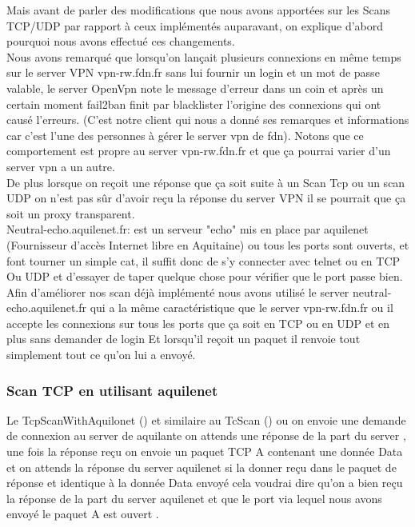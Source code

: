 \documentclass[12pt,a4paper]{article}
\begin{document}
Mais avant de parler des modifications que nous avons apportées sur les Scans TCP/UDP par rapport à ceux implémentés auparavant, on explique d’abord pourquoi nous avons effectué ces changements.\\

Nous avons remarqué que lorsqu’on lançait plusieurs connexions en même temps sur le server VPN vpn-rw.fdn.fr sans lui fournir un login et un mot de passe valable, le server OpenVpn note le message d’erreur dans un coin et après un certain moment fail2ban finit par blacklister l’origine des connexions qui ont causé l’erreurs. (C’est notre client qui nous a donné ses remarques et informations car c’est l’une des personnes à gérer le server vpn de fdn).  Notons que ce comportement est propre au server vpn-rw.fdn.fr et que ça pourrai varier d’un server vpn a un autre.\\

De plus lorsque on reçoit une réponse que ça soit suite à un Scan Tcp ou un scan UDP on n’est pas sûr d’avoir reçu la réponse du server VPN il se pourrait que ça soit un proxy transparent.\\

Neutral-echo.aquilenet.fr: est un serveur "echo" mis en place par aquilenet (Fournisseur d'accès Internet libre en Aquitaine) ou tous les ports sont ouverts, et font tourner un simple cat, il suffit donc de s'y connecter avec telnet ou en TCP Ou UDP et d'essayer de taper quelque chose pour vérifier que le port passe bien. \\

Afin d’améliorer nos scan déjà implémenté nous avons utilisé le server neutral-echo.aquilenet.fr qui a la même caractéristique que le server vpn-rw.fdn.fr  ou il accepte les connexions sur tous les ports que ça soit en TCP ou en UDP et en plus sans demander de login Et lorsqu’il reçoit un paquet il renvoie tout simplement tout ce qu’on lui a envoyé. \\
\subsubsection{Scan TCP en utilisant aquilenet}
Le TcpScanWithAquilonet ()  et similaire au TcScan () ou on envoie une demande de connexion au server de aquilante on attends une réponse de la part du server , une fois la réponse reçu on envoie un paquet TCP A contenant une donnée  Data et on attends la réponse du server aquilenet  si la donner reçu dans le paquet de réponse et identique à la donnée Data envoyé cela voudrai dire qu’on a bien reçu la réponse de la part du server aquilenet et que le port via lequel nous avons envoyé le paquet A est ouvert .\\
\end{document}
